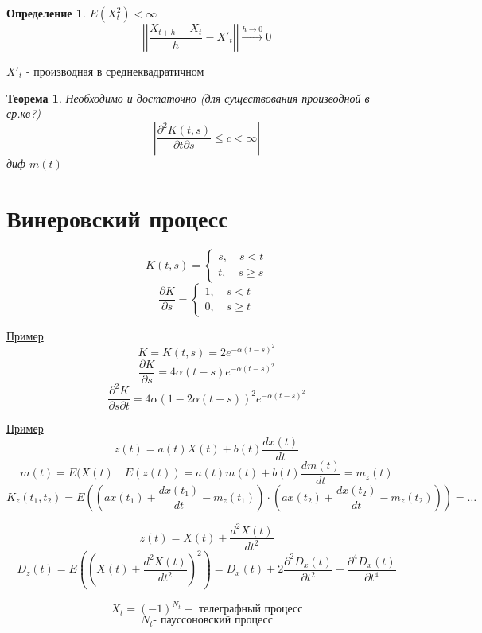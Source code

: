 \documentclass[a4paper]{article}
\newtheorem{theorem}{Теорема}
\theoremstyle{definition}
\newtheorem*{definition}{Определение}
\begin{document}
\begin{tcolorbox}
\begin{definition}
    $ E(X_t^2) < \infty $ 
    \[
        \left|\left| \frac{X_{t+h}- X_t}{h} - X'_t \right|\right| \xrightarrow{h\to 0} 0
    \]

    $ X'_t $ - производная в среднеквадратичном
\end{definition}
\end{tcolorbox}

\begin{tcolorbox}
\begin{theorem}
    Необходимо и достаточно (для существования производной в ср.кв?)
    \[
        \left| \frac{\partial^{2} K(t,s)}{\partial t \partial s} \leq c < \infty 
        \right|
    \]
    диф $ m(t) $ 
\end{theorem}
\end{tcolorbox}

\section*{\centering Винеровский процесс}
\[
    K(t,s) = 
    \begin{cases}
        s, \quad s < t\\
        t, \quad s \geq s
    \end{cases}
\]
\[
    \frac{\partial K}{\partial s} = 
    \begin{cases}
        1, \quad s < t\\
        0, \quad s \geq t
    \end{cases}
\]

\underline{Пример}
\[
    K = K(t,s) = 2 e^{- \alpha (t-s)^2}
\]
\[
    \frac{\partial K}{\partial s} = 4 \alpha(t-s) e^{- \alpha (t-s)^2 }
\]
\[
    \frac{\partial^2 K}{\partial s \partial t} = 4 \alpha(1 - 2 \alpha(t-s))^2
    e^{- \alpha (t-s)^2 }
\]

\underline{Пример}
\[
    z(t) = a(t) X(t) + b(t) \frac{dx(t)}{dt} 
\]
\[
    m(t) = E(X(t) \quad E(z(t)) = a(t) m(t) + b(t) \frac{dm(t)}{dt} = m_z(t)
\]
\[
    K_z(t_1, t_2) = E\left(\left(ax(t_1) + \frac{dx(t_1)}{dt} -m_z(t_1)\right) \cdot
    \left(ax(t_2) + \frac{dx(t_2)}{dt} -m_z(t_2)\right)\right) = \dots
\]

\[
    z(t) = X(t) + \frac{d^2 X(t)}{dt^2} 
\]
\[
    D_z(t) = E\left( \left( X(t) + \frac{d^2 X(t)}{dt^2} \right)^2 \right)
    = D_x(t) + 2 \frac{\partial^{2} D_x(t)}{\partial t^2} +
    \frac{\partial^{4} D_x(t)}{\partial t^4}
\]

\[
    X_t = (-1)^{N_t} - \text{ телеграфный процесс}
\]
\[
    N_t  \text{- пауссоновский процесс}
\]
\end{document}
